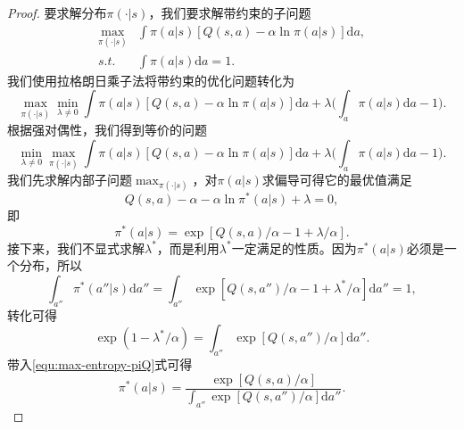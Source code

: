 \begin{proof}
    要求解分布$\pi(\cdot \vert s)$，我们要求解带约束的子问题
    \begin{equation}
        \begin{aligned}
        \max_{\pi(\cdot \vert s)}& \int \pi(a \vert s) [Q(s, a) - \alpha \ln \pi(a \vert s)] \mathrm{d} a, \\
        s.t.& \int \pi(a \vert s) \mathrm{d} a = 1.
        \end{aligned}
    \end{equation}
    我们使用拉格朗日乘子法将带约束的优化问题转化为
    \begin{equation}
        \max_{\pi(\cdot \vert s)} \min_{\lambda \ne 0} \int \pi(a \vert s) [Q(s, a) - \alpha \ln \pi(a \vert s)] \mathrm{d} a + \lambda\bigg(\int_a \pi(a \vert s) \mathrm{d} a - 1\bigg).
    \end{equation}
    根据强对偶性，我们得到等价的问题
    \begin{equation}
        \min_{\lambda \ne 0}\max_{\pi(\cdot \vert s)} \int \pi(a \vert s) [Q(s, a) - \alpha \ln \pi(a \vert s)] \mathrm{d} a + \lambda\bigg(\int_a \pi(a \vert s) \mathrm{d} a - 1\bigg).
    \end{equation}
    我们先求解内部子问题$\max_{\pi(\cdot \vert s)}$，对$\pi(a \vert s)$求偏导可得它的最优值满足
    \begin{equation}
        Q(s, a) - \alpha - \alpha \ln \pi^*(a \vert s) + \lambda = 0,
    \end{equation}
    即
    \begin{equation}\label{equ:max-entropy-piQ}
        \pi^*(a \vert s) = \exp[Q(s, a)/\alpha - 1 + \lambda/\alpha].
    \end{equation}
    接下来，我们不显式求解$\lambda^*$，而是利用$\lambda^*$一定满足的性质。因为$\pi^*(a \vert s)$必须是一个分布，所以
    \begin{equation}
        \int_{a''} \pi^*(a'' \vert s) \mathrm{d} a'' = \int_{a''} \exp[Q(s, a'')/\alpha - 1 + \lambda^*/\alpha] \mathrm{d} {a''} = 1,
    \end{equation}
    转化可得
    \begin{equation}
        \exp(1 - \lambda^*/\alpha) = \int_{a''} \exp[Q(s, a'')/\alpha]\mathrm{d} {a''}.
    \end{equation}
    带入\eqref{equ:max-entropy-piQ}式可得
    \begin{equation}
        \pi^*(a \vert s) = \frac{\exp[Q(s, a)/\alpha]}{\int_{a''} \exp [Q(s, a'')/\alpha] \mathrm{d} a''}.
    \end{equation}
\end{proof}

